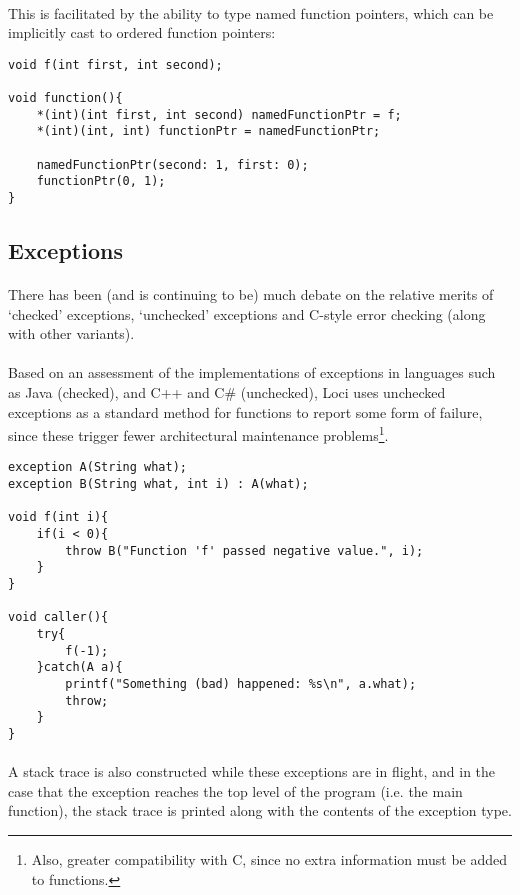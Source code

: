 \documentclass[12pt,twoside,notitlepage]{report}
\begin{document}
\paragraph{}
This is facilitated by the ability to type named function pointers, which can be implicitly cast to ordered function pointers:

\small{
\begin{verbatim}
void f(int first, int second);

void function(){
    *(int)(int first, int second) namedFunctionPtr = f;
    *(int)(int, int) functionPtr = namedFunctionPtr;
    
    namedFunctionPtr(second: 1, first: 0);
    functionPtr(0, 1);
}
\end{verbatim}
}

\subsection{Exceptions}

\paragraph{}
There has been (and is continuing to be) much debate on the relative merits of `checked' exceptions, `unchecked' exceptions and C-style error checking (along with other variants).

\paragraph{}
Based on an assessment of the implementations of exceptions in languages such as Java (checked), and C++ and C\# (unchecked), Loci uses unchecked exceptions as a standard method for functions to report some form of failure, since these trigger fewer architectural maintenance problems\footnote{Also, greater compatibility with C, since no extra information must be added to functions.}.

\small{
\begin{verbatim}
exception A(String what);
exception B(String what, int i) : A(what);

void f(int i){
    if(i < 0){
        throw B("Function 'f' passed negative value.", i);
    }
}

void caller(){
    try{
        f(-1);
    }catch(A a){
        printf("Something (bad) happened: %s\n", a.what);
        throw;
    }
}
\end{verbatim}
}

\paragraph{}
A stack trace is also constructed while these exceptions are in flight, and in the case that the exception reaches the top level of the program (i.e. the main function), the stack trace is printed along with the contents of the exception type.
\end{document}
